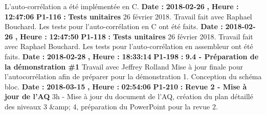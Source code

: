 \documentclass{article}%
\begin{document}
L'auto{-}corrélation a été implémentée en C.\newline%
\newline%
%
\textbf{Date : }%
\textbf{2018{-}02{-}26}%
\textbf{,}%
\textbf{ Heure : }%
\textbf{12:47:06}%
\newline%
%
\textbf{P1{-}116 }%
\textbf{ : }%
\textbf{ Tests unitaires}%
\newline%
\newline%
%
26 février 2018.\newline%
Travail fait avec Raphael Bouchard.\newline%
Les tests pour l'auto{-}corrélation en C ont été faits.\newline%
\newline%
%
\textbf{Date : }%
\textbf{2018{-}02{-}26}%
\textbf{,}%
\textbf{ Heure : }%
\textbf{12:47:50}%
\newline%
%
\textbf{P1{-}118 }%
\textbf{ : }%
\textbf{ Tests unitaires}%
\newline%
\newline%
%
26 février 2018.\newline%
Travail fait avec Raphael Bouchard.\newline%
Les tests pour l'auto{-}corrélation en assembleur ont été faits.\newline%
\newline%
%
\textbf{Date : }%
\textbf{2018{-}02{-}28}%
\textbf{,}%
\textbf{ Heure : }%
\textbf{18:33:14}%
\newline%
%
\textbf{P1{-}198 }%
\textbf{ : }%
\textbf{ 9.4 {-} Préparation de la démonstration \#1}%
\newline%
\newline%
%
Travail avec Jeffrey Rolland\newline%
Mise à jour finale pour l'autocorrélation afin de préparer pour la démonstration 1. Conception du schéma bloc.\newline%
\newline%
%
\textbf{Date : }%
\textbf{2018{-}03{-}15}%
\textbf{,}%
\textbf{ Heure : }%
\textbf{02:54:06}%
\newline%
%
\textbf{P1{-}210 }%
\textbf{ : }%
\textbf{ Revue 2 {-} Mise à jour de l'AQ}%
\newline%
\newline%
%
3h {-} Mise à jour du document de l'AQ, création du plan détaillé des niveaux 3 \&amp; 4, préparation du PowerPoint pour la revue 2.\newline%
\newline%
%
\newpage
\end{document}
